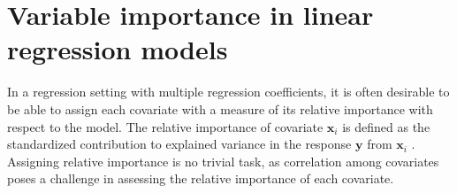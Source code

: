 \section{Variable importance in linear regression models}
In a regression setting with multiple regression coefficients, it is often desirable to be able to assign each covariate with a measure of its relative importance with respect to the model.
The relative importance of covariate $\mathbf{x}_i$ is defined as the standardized contribution to explained variance in the response $\mathbf{y}$ from $\mathbf{x}_i$ \citep{gromping_relaimpo}.
Assigning relative importance is no trivial task, as correlation among covariates poses a challenge in assessing the relative importance of each covariate.
\newline
\newline



